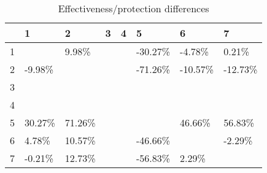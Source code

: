 \begin{table}[ht]
\centering
\begin{tabular}{rlllllll}
  \hline
 & 1 & 2 & 3 & 4 & 5 & 6 & 7 \\ 
  \hline
1 &  & 9.98\% &  &  & -30.27\% & -4.78\% & 0.21\% \\ 
  2 & -9.98\% &  &  &  & -71.26\% & -10.57\% & -12.73\% \\ 
  3 &  &  &  &  &  &  &  \\ 
  4 &  &  &  &  &  &  &  \\ 
  5 & 30.27\% & 71.26\% &  &  &  & 46.66\% & 56.83\% \\ 
  6 & 4.78\% & 10.57\% &  &  & -46.66\% &  & -2.29\% \\ 
  7 & -0.21\% & 12.73\% &  &  & -56.83\% & 2.29\% &  \\ 
   \hline
\end{tabular}
\caption{Effectiveness/protection differences} 
\end{table}
